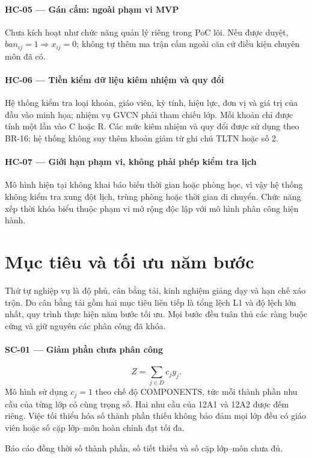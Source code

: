 \documentclass[12pt,a4paper]{report}
\begin{document}
\paragraph{HC-05 --- Gán cấm: ngoài phạm vi MVP}
Chưa kích hoạt như chức năng quản lý riêng trong PoC lõi. Nếu được duyệt,
$ban_{ij}=1\Rightarrow x_{ij}=0$; không tự thêm ma trận cấm ngoài căn cứ
điều kiện chuyên môn đã có.
\paragraph{HC-06 --- Tiền kiểm dữ liệu kiêm nhiệm và quy đổi}
Hệ thống kiểm tra loại khoản, giáo viên, kỳ tính, hiệu lực, đơn vị và giá trị của đầu vào minh họa; nhiệm vụ GVCN phải tham chiếu lớp. Mỗi khoản chỉ được tính một lần vào C hoặc R. Các mức kiêm nhiệm và quy đổi được sử dụng theo BR-16; hệ thống không suy thêm khoản giảm từ ghi chú TLTN hoặc số 2.

\paragraph{HC-07 --- Giới hạn phạm vi, không phải phép kiểm tra lịch}
Mô hình hiện tại không khai báo biến thời gian hoặc phòng học, vì vậy hệ thống không kiểm tra xung đột lịch, trùng phòng hoặc thời gian di chuyển. Chức năng xếp thời khóa biểu thuộc phạm vi mở rộng độc lập với mô hình phân công hiện hành.



\section{Mục tiêu và tối ưu năm bước}\label{sec:objectives}
Thứ tự nghiệp vụ là độ phủ, cân bằng tải, kinh nghiệm giảng dạy và hạn chế xáo trộn. Do cân bằng tải gồm hai mục tiêu liên tiếp là tổng lệch L1 và độ lệch lớn nhất, quy trình thực hiện năm bước tối ưu. Mọi bước đều tuân thủ các ràng buộc cứng và giữ nguyên các phân công đã khóa.
\paragraph{SC-01 --- Giảm phần chưa phân công}
\[
Z=\sum_{j\in D}c_jy_j.
\]
Mô hình sử dụng $c_j=1$ theo chế độ COMPONENTS, tức mỗi thành phần nhu cầu của từng lớp có cùng trọng số. Hai nhu cầu của 12A1 và 12A2 được đếm riêng. Việc tối thiểu hóa số thành phần thiếu không bảo đảm mọi lớp đều có giáo viên hoặc số cặp lớp--môn hoàn chỉnh đạt tối đa.

Báo cáo đồng thời số thành phần, số tiết thiếu và số cặp lớp--môn chưa đủ.
\end{document}
